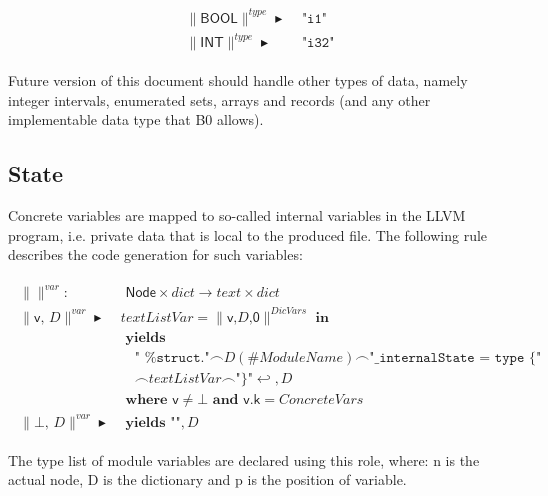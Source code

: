 \documentclass{article}
\newcommand{\trad}[2]{\ensuremath{\lVert \textsf{#1} \rVert^{\textit{#2}}}}
\newcommand{\nl}[0]{\ensuremath{\hookleftarrow}}
\DeclareMathOperator{\conc}{\smallfrown}
\DeclareMathOperator{\isdef}{\blacktriangleright}
\begin{document}
\begin{framed}
\begin{align}
\begin{split}
  \trad{BOOL}{type} \isdef & \texttt{ "i1"} \\
  \trad{INT}{type} \isdef & \texttt{ "i32"}
\end{split}
\end{align}
\end{framed}

Future version of this document should handle other types of data,
namely integer intervals, enumerated sets, arrays and records (and
any other implementable data type that B0 allows).

\subsection{State}
\label{sec:state}

Concrete variables are mapped to so-called internal variables in the
LLVM program, i.e. private data that is local to the produced
file. The following rule describes the code generation for such
variables:


\begin{framed}
\begin{align}
\begin{split}
  \trad{}{var} : & \textsf{ Node} \times dict \rightarrow text \times dict \\
  \trad{v, $D$}{var} \isdef & textListVar = \trad{v,$D$,0}{DicVars}  \textbf{ in}\\
  & \textbf{ yields } \\
  & \quad \texttt{" \%struct."}\conc  D(\#ModuleName) \conc \texttt{"\_internalState = type \{"} \\
  & \quad  \conc textListVar \conc \texttt{"\} "}  \nl , D \\
  & \textbf{ where } \textsf{v} \ne  \bot \textbf{ and }  \textsf{v.k} = ConcreteVars \\
  \trad{$\bot$, $D$}{var} \isdef & \textbf{ yields } \texttt{""}, D
\end{split}
\end{align}
\end{framed}


The type list of module variables are declared using this role, where:
n is the actual node, D is the dictionary and  p is the position of variable.
\end{document}
